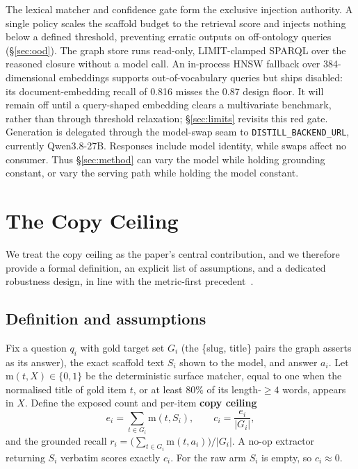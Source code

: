 \documentclass[10pt,twocolumn]{article}
\begin{document}
The lexical matcher and confidence gate form the exclusive injection authority. A single policy scales the scaffold budget to the retrieval score and injects nothing below a defined threshold, preventing erratic outputs on off-ontology queries (\S\ref{sec:ood}). The graph store runs read-only, LIMIT-clamped SPARQL over the reasoned closure without a model call. An in-process HNSW fallback over 384-dimensional embeddings supports out-of-vocabulary queries but ships disabled: its document-embedding recall of 0.816 misses the 0.87 design floor. It will remain off until a query-shaped embedding clears a multivariate benchmark, rather than through threshold relaxation; \S\ref{sec:limits} revisits this red gate. Generation is delegated through the model-swap seam to \texttt{DISTILL\_BACKEND\_URL}, currently Qwen3.8-27B. Responses include model identity, while swaps affect no consumer. Thus \S\ref{sec:method} can vary the model while holding grounding constant, or vary the serving path while holding the model constant.


\section{The Copy Ceiling}\label{sec:ceiling}
We treat the copy ceiling as the paper's central contribution, and we therefore provide a formal definition, an explicit list of assumptions, and a dedicated robustness design, in line with the metric-first precedent~\cite{min2023factscore,gao2023alce}.

\subsection{Definition and assumptions}
Fix a question $q_i$ with gold target set $G_i$ (the \{slug, title\} pairs the graph asserts as its answer), the exact scaffold text $S_i$ shown to the model, and answer $a_i$. Let $\mathrm{m}(t,X)\in\{0,1\}$ be the deterministic surface matcher, equal to one when the normalised title of gold item $t$, or at least $80\%$ of its length-$\geq4$ words, appears in $X$. Define the exposed count and per-item \textbf{copy ceiling}
\[
  e_i=\sum_{t\in G_i}\mathrm{m}(t,S_i),\qquad
  c_i=\frac{e_i}{|G_i|},
\]
and the grounded recall $r_i=\bigl(\sum_{t\in G_i}\mathrm{m}(t,a_i)\bigr)/|G_i|$. A no-op extractor returning $S_i$ verbatim scores exactly $c_i$. For the raw arm $S_i$ is empty, so $c_i\approx0$.
\end{document}
